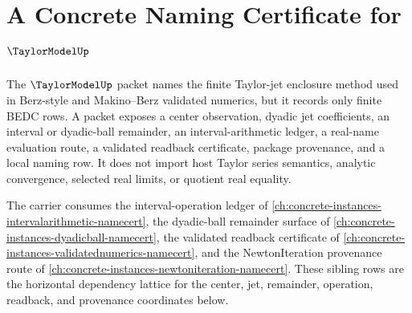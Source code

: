 \chapter{A Concrete Naming Certificate for $\TaylorModelUp$}
\label{ch:concrete-instances-taylormodel-namecert}

The $\TaylorModelUp$ packet names the finite Taylor-jet enclosure method used in Berz-style and Makino--Berz validated numerics, but it records only finite BEDC rows. A packet exposes a center observation, dyadic jet coefficients, an interval or dyadic-ball remainder, an interval-arithmetic ledger, a real-name evaluation route, a validated readback certificate, package provenance, and a local naming row. It does not import host Taylor series semantics, analytic convergence, selected real limits, or quotient real equality.

The carrier consumes the interval-operation ledger of \autoref{ch:concrete-instances-intervalarithmetic-namecert}, the dyadic-ball remainder surface of \autoref{ch:concrete-instances-dyadicball-namecert}, the validated readback certificate of \autoref{ch:concrete-instances-validatednumerics-namecert}, and the NewtonIteration provenance route of \autoref{ch:concrete-instances-newtoniteration-namecert}. These sibling rows are the horizontal dependency lattice for the center, jet, remainder, operation, readback, and provenance coordinates below.

